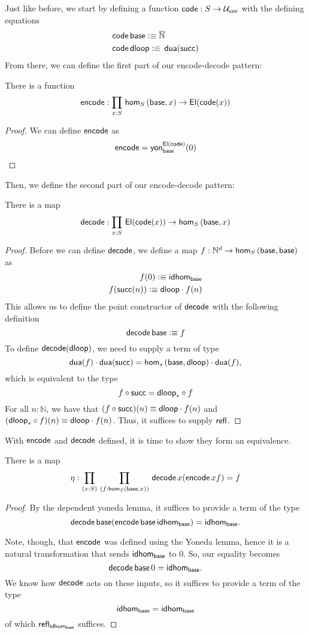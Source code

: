 \documentclass[main.tex]{subfiles}
\begin{document}
Just like before, we start by defining a function $\co : S \to \uc$ with the defining equations
\begin{align*}
    &\co\,\ba \defeq \enn\\
    &\co\,\dl \defeq \, \dua(\su)
\end{align*}
From there, we can define the first part of our encode-decode pattern:
\begin{lemma}
    There is a function
    $$\eco : \prd{x : S}\ho[S]{\ba}{x} \to \El(\co(x))$$
\end{lemma}
\begin{proof}
    We can define $\eco$ as 
    \begin{align*}
        \eco = \yon{\El(\co)}{\ba}(0)
    \end{align*}    
\end{proof}
Then, we define the second part of our encode-decode pattern:
\begin{lemma}
    There is a map $$\dco : \prd{x:S}\El(\co(x)) \to \ho[S]{\ba}{x}$$
\end{lemma}
\begin{proof}
    Before we can define $\dco$, we define a map $f : \Nd \to \ho[S]{\ba}{\ba}$ as 
    \begin{align*}
        f(0) \defeq \idhom{\ba}\\
        f(\su(n)) \defeq \dl \cdot f(n)
    \end{align*}
    This allows us to define the point constructor of $\dco$ with the following definition 
    \[
    \dco \, \ba \defeq f
    \]
    To define $\dco(\dl)$, we need to supply a term of type 
    \[
    \dua(f) \cdot \dua(\su) = \ho[s]{\ba}{\dl} \cdot \dua(f),
    \]
    which is equivalent to the type 
    \[
    f \circ \su = \dl_* \circ f 
    \]
    For all $n : \mathbb{N}$, we have that $(f \circ \su)(n) \equiv \dl \cdot f(n)$ and $(\dl_* \circ f )(n) \equiv \dl \cdot f(n)$. Thus,
    it suffices to supply $\refl{}$.
    
\end{proof}
With $\eco$ and $\dco$ defined, it is time to show they form an equivalence.
\begin{lemma}
    There is a map 
    $$ \eta : \prd{x : S}{f : \ho[S]{\ba}{x}} \dco \, x (\eco \, x f) = f$$
\end{lemma}
\begin{proof}
By the dependent yoneda lemma, it suffices to provide a term of the type
$$\dco \, \ba (\eco \, \ba\,\idhom{\ba}) = \idhom{\ba}.$$

Note, though, that $\eco$ was defined using the Yoneda lemma, hence it is a natural transformation that sends $\idhom{\ba}$ to $0$. So, our equality becomes $$
\dco \, \ba \, 0 = \idhom{\ba}.$$ We know how $\dco$ acts on these inputs, so it suffices to provide a term of the type
$$\idhom{\ba} = \idhom{\ba}$$
of which $\refl{\idhom{\ba}}$ suffices.
\end{proof}
\end{document}
